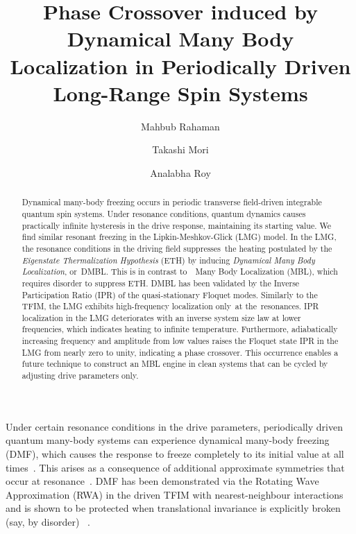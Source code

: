 \documentclass[%
reprint,
superscriptaddress,
amsmath,amssymb,
aps,
prb,
showkeys,
]{revtex4-2}
\begin{document}

\title{Phase Crossover induced by Dynamical Many Body Localization in Periodically Driven Long-Range Spin Systems}

\author{Mahbub Rahaman}
\author{Takashi Mori}
\author{Analabha Roy}


\begin{abstract}
	Dynamical many-body freezing occurs in periodic transverse field-driven integrable quantum spin systems. Under resonance conditions, quantum dynamics causes practically infinite hysteresis in the drive response, maintaining its starting value. We find similar resonant freezing in the Lipkin-Meshkov-Glick (LMG) model. In the LMG, the resonance conditions in the driving field suppresses the heating postulated by the \textit{Eigenstate Thermalization Hypothesis} (ETH)		
	by inducing \textit{Dynamical Many Body Localization}, or DMBL. This is in contrast to  Many Body Localization (MBL), which requires disorder to suppress ETH. DMBL has been validated by the Inverse Participation Ratio (IPR) of the quasi-stationary Floquet modes. Similarly to the TFIM, the LMG exhibits high-frequency localization only at the resonances. IPR localization in the LMG deteriorates with an inverse system size law at lower frequencies, which indicates heating to infinite temperature. Furthermore, adiabatically increasing frequency and amplitude from low values raises the Floquet state IPR in the LMG from nearly zero to unity, indicating a phase crossover. This occurrence enables a future technique to construct an MBL engine in clean systems that can be cycled by adjusting drive parameters only.
\end{abstract}

\maketitle

Under certain resonance conditions in the drive parameters, periodically driven quantum many-body systems can experience dynamical many-body freezing (DMF), which causes the response to freeze completely to its initial value at all times~\cite{bordia_periodically_2017, sahoo_periodically_2019, das_exotic_2010}. This arises as a consequence of additional approximate symmetries that occur at resonance~\cite{asmi:scars}. DMF has been demonstrated via the Rotating Wave Approximation (RWA) in the driven TFIM with nearest-neighbour interactions ~\cite{mbeng_quantum_2020} and is shown to be protected when translational invariance is explicitly broken (say, by disorder) ~\cite{yamada_localization_2022, roy_fate_2015}. 
\end{document}
